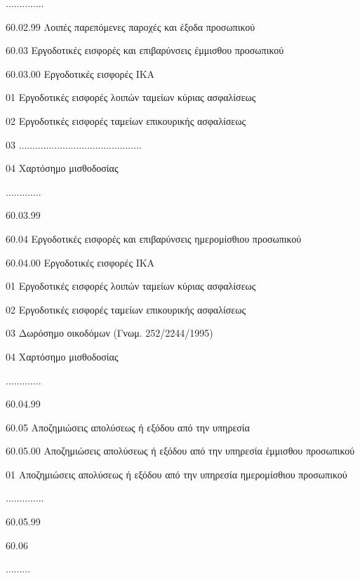 \documentclass[A4,10pt,greek]{book}
\begin{document}
                    ..............

                    60.02.99       Λοιπές παρεπόμενες παροχές και έξοδα προσωπικού

        60.03   Εργοδοτικές εισφορές και επιβαρύνσεις έμμισθου προσωπικού

                    60.03.00   Εργοδοτικές εισφορές ΙΚΑ

                               01   Εργοδοτικές εισφορές λοιπών ταμείων κύριας ασφαλίσεως

                               02   Εργοδοτικές εισφορές ταμείων επικουρικής ασφαλίσεως

                               03   .............................................

                               04   Χαρτόσημο μισθοδοσίας

                    .............

                    60.03.99

        60.04   Εργοδοτικές εισφορές και επιβαρύνσεις ημερομίσθιου προσωπικού

                    60.04.00   Εργοδοτικές εισφορές ΙΚΑ

                               01   Εργοδοτικές εισφορές λοιπών ταμείων κύριας ασφαλίσεως

                               02   Εργοδοτικές εισφορές ταμείων επικουρικής ασφαλίσεως

                               03   Δωρόσημο οικοδόμων (Γνωμ. 252/2244/1995)

                               04   Χαρτόσημο μισθοδοσίας

                    .............

                    60.04.99

        60.05   Αποζημιώσεις απολύσεως ή εξόδου από την υπηρεσία

                    60.05.00    Αποζημιώσεις απολύσεως ή εξόδου από την υπηρεσία
                                      έμμισθου προσωπικού

                               01   Αποζημιώσεις απολύσεως ή εξόδου από την υπηρεσία
                                       ημερομίσθιου προσωπικού

                    ..............

                    60.05.99

        60.06

        .........
\end{document}
